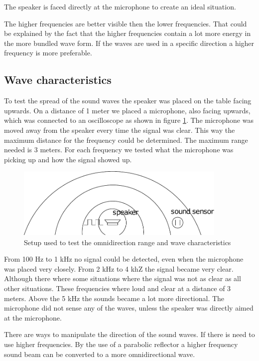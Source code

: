 \documentclass[10pt,a4paper]{article}
\begin{document}
The speaker is faced directly at the microphone to create an ideal situation. 

The higher frequencies are better visible then the lower frequencies. That could be explained by the fact that the higher frequencies contain a lot more energy in the more bundled wave form. If the waves are used in a specific direction a higher frequency is more preferable.  

\subsection{Wave characteristics}

To test the spread of the sound waves the speaker was placed on the table facing upwards. On a distance of 1 meter we placed a microphone, also facing upwards, which was connected to an oscilloscope as shown in figure \ref{setup2}. The microphone was moved away from the speaker every time the signal was clear. This way the maximum distance for the frequency could be determined. The maximum range needed is 3 meters. For each frequency we tested what the microphone was picking up and how the signal showed up. 

\begin{figure}[H]
\centering
\includegraphics[width=0.9\textwidth]{situation2.pdf}
\caption{Setup used to test the omnidirection range and wave characteristics} 
\label{setup2}
\end{figure}

From 100 Hz to 1 kHz no signal could be detected, even when the microphone was placed very closely. From 2 kHz to 4 khZ the signal became very clear. Although there where some situations where the signal was not as clear as all other situations. These frequencies where loud and clear at a distance of 3 meters. Above the 5 kHz the sounds became a lot more directional. The microphone did not sense any of the waves, unless the speaker was directly aimed at the microphone. 
 
There are ways to manipulate the direction of the sound waves. If there is need to use higher frequencies. By the use of a parabolic reflector a higher frequency sound beam can be converted to a more omnidirectional wave. 
\end{document}
